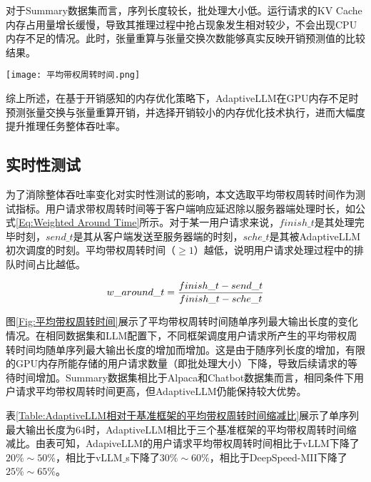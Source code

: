 对于Summary数据集而言，序列长度较长，批处理大小低。运行请求的KV Cache内存占用量增长缓慢，导致其推理过程中抢占现象发生相对较少，不会出现CPU内存不足的情况。此时，张量重算与张量交换次数能够真实反映开销预测值的比较结果。

\begin{figure*}[!htbp]
  \centering
  \texttt{[image: 平均带权周转时间.png]}
  \caption{用户请求平均带权周转时间}
  \label{Fig:平均带权周转时间}
\end{figure*}

综上所述，在基于开销感知的内存优化策略下，AdaptiveLLM在GPU内存不足时预测张量交换与张量重算开销，并选择开销较小的内存优化技术执行，进而大幅度提升推理任务整体吞吐率。 

\subsection{实时性测试}

为了消除整体吞吐率变化对实时性测试的影响，本文选取平均带权周转时间作为测试指标。用户请求带权周转时间等于客户端响应延迟除以服务器端处理时长，如公式\ref{Eq:Weighted Around Time}所示。对于某一用户请求来说，$finish\_t$是其处理完毕时刻，$send\_t$是其从客户端发送至服务器端的时刻，$sche\_t$是其被AdaptiveLLM初次调度的时刻。平均带权周转时间（$\geq 1$）越低，说明用户请求处理过程中的排队时间占比越低。 

\begin{equation}
  \begin{aligned}
    w\_around\_t = \frac{finish\_t - send\_t}{finish\_t - sche\_t}
  \end{aligned}
  \label{Eq:Weighted Around Time}
  \setlength{\abovedisplayskip}{0ex}
  \setlength{\belowdisplayskip}{2ex}
\end{equation}

图\ref{Fig:平均带权周转时间}展示了平均带权周转时间随单序列最大输出长度的变化情况。在相同数据集和LLM配置下，不同框架调度用户请求所产生的平均带权周转时间均随单序列最大输出长度的增加而增加。这是由于随序列长度的增加，有限的GPU内存所能存储的用户请求数量（即批处理大小）下降，导致后续请求的等待时间增加。Summary数据集相比于Alpaca和Chatbot数据集而言，相同条件下用户请求平均带权周转时间更高，但AdaptiveLLM仍能保持较大优势。

表\ref{Table:AdaptiveLLM相对于基准框架的平均带权周转时间缩减比}展示了单序列最大输出长度为64时，AdaptiveLLM相比于三个基准框架的平均带权周转时间缩减比。由表可知，AdapiveLLM的用户请求平均带权周转时间相比于vLLM下降了$20\%\sim50\%$，相比于vLLM$\_$s下降了$30\%\sim60\%$，相比于DeepSpeed-MII下降了$25\%\sim65\%$。

